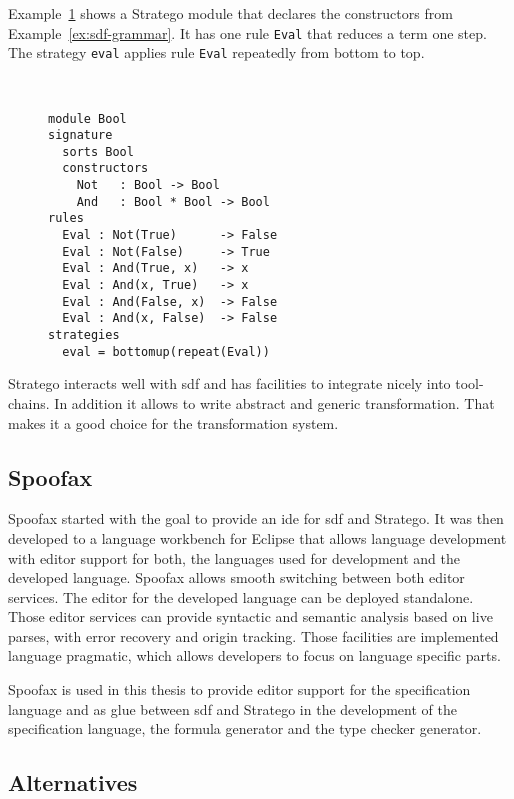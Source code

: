 Example~\ref{ex:stratego-module} shows a Stratego module that declares
the constructors from Example~\ref{ex:sdf-grammar}. It has one rule
\verb|Eval| that reduces a term one step. The strategy \verb|eval|
applies rule \verb|Eval| repeatedly from bottom to top.

\begin{figure}
\begin{example}{~}
\begin{lstlisting}[language=stratego]
module Bool
signature
  sorts Bool
  constructors
    Not   : Bool -> Bool 
    And   : Bool * Bool -> Bool
rules
  Eval : Not(True)      -> False
  Eval : Not(False)     -> True
  Eval : And(True, x)   -> x
  Eval : And(x, True)   -> x
  Eval : And(False, x)  -> False
  Eval : And(x, False)  -> False
strategies
  eval = bottomup(repeat(Eval))
\end{lstlisting}
\label{ex:stratego-module}
\end{example}
\end{figure}

Stratego interacts well with \gls{sdf} and has facilities to integrate
nicely into tool-chains. In addition it allows to write abstract and
generic transformation. That makes it a good choice for the
transformation system.
\subsection{Spoofax}
Spoofax\cite{KatsV10} started with the goal to provide an \gls{ide}
for \gls{sdf} and Stratego. It was then developed to a language
workbench for Eclipse that allows language development with editor
support for both, the languages used for development and the developed
language. Spoofax allows smooth switching between both editor
services. The editor for the developed language can be deployed
standalone. Those editor services can provide syntactic and semantic
analysis based on live parses, with error recovery and origin
tracking. Those facilities are implemented language pragmatic, which
allows developers to focus on language specific parts.

Spoofax is used in this thesis to provide editor support for the
specification language and as glue between \gls{sdf} and Stratego in the
development of the specification language, the formula generator and
the type checker generator.
\subsection{Alternatives}
